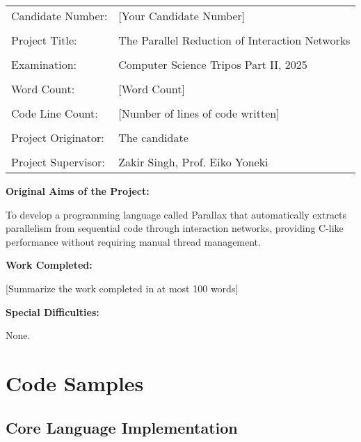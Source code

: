 \documentclass[12pt,a4paper]{report}
\begin{document}
\begin{tabular}{ll}
Candidate Number: & [Your Candidate Number] \\
\\
Project Title: & The Parallel Reduction of Interaction Networks \\
\\
Examination: & Computer Science Tripos Part II, 2025 \\
\\
Word Count: & [Word Count] \\
\\
Code Line Count: & [Number of lines of code written] \\
\\
Project Originator: & The candidate \\
\\
Project Supervisor: & Zakir Singh, Prof. Eiko Yoneki \\
\end{tabular}

\vspace{1cm}
\textbf{Original Aims of the Project:}

To develop a programming language called Parallax that automatically extracts parallelism from sequential code through interaction networks, providing C-like performance without requiring manual thread management.

\vspace{1cm}
\textbf{Work Completed:}

[Summarize the work completed in at most 100 words]

\vspace{1cm}
\textbf{Special Difficulties:}

None.

\newpage

\tableofcontents
\newpage








\nocite{*}


\appendix
\chapter{Code Samples}
\section{Core Language Implementation}
\end{document}
